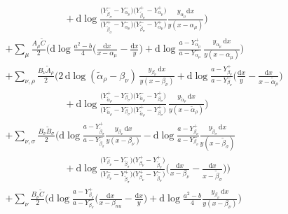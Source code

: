 \documentclass[a4paper,12pt]{article}
\newcommand{\dif}{\mathrm{d}} %
\begin{document}
\begin{enumerate}[label=(\roman*)]
\begin{align}
         &\qquad  \qquad  \qquad  +\dif \log\frac{\bigl(Y^{-}_{\tilde{\beta}_{\sigma}}-Y^{-}_{\alpha_{\mu}}\bigr)\bigl(Y^{+}_{\tilde{\beta}_{\sigma}}-Y^{+}_{\alpha_{\mu}}\bigr)}{\bigl(Y^{+}_{\tilde{\beta}_{\sigma}}-Y^{-}_{\alpha_{\mu}}\bigr)\bigl(Y^{-}_{\tilde{\beta}_{\sigma}}-Y^{+}_{\alpha_{\mu}}\bigr)} \frac{y_{\alpha_{\mu}}\dif x}{y(x-\alpha_{\mu})}\Biggr) \nonumber \\
         &+\sum_{\mu} \frac{A_{\mu}\tilde{C}}{2} \Biggl( \dif \log\frac{a^{2}-b}{4} \biggl(\frac{\dif x}{x-\alpha_{\mu}}-\frac{\dif x}{y}\biggr) 
          +\dif \log\frac{a-Y^{+}_{\alpha_{\mu}}}{a-Y^{-}_{\alpha_{\mu}}}\, \frac{y_{\alpha_{\mu}}\,\dif x}{y(x-\alpha_{\mu})} \Biggr) \nonumber \\
         &+\sum_{\nu,\rho} \frac{B_{\nu}\tilde{A}_{\rho}}{2}\Biggl( 2\,\dif \log(\tilde{\alpha}_{\rho}-\beta_{\nu})\,\frac{y_{\beta_{\nu}}\,\dif x}{y(x-\beta_{\nu})} 
          +\dif \log\frac{a-Y^{+}_{\beta_{\nu}}}{a-Y^{-}_{\beta_{\nu}}} \biggl(\frac{\dif x}{y}-\frac{\dif x}{x-\tilde{\alpha}_{\rho}}\biggr)  \nonumber \\
         & \qquad  \qquad  \qquad  + \dif \log\frac{\bigl(Y_{\tilde{\alpha}_{\rho}}^{+}-Y_{\beta_{\sigma}}^{-}\bigr)\bigl(Y_{\tilde{\alpha}_{\rho}}^{-}-Y_{\beta_{\sigma}}^{+}\bigr)}{\bigl(Y_{\tilde{\alpha}_{\rho}}^{-}-Y_{\beta_{\sigma}}^{-}\bigr)\bigl(Y_{\tilde{\alpha}_{\rho}}^{+}-Y_{\beta_{\sigma}}^{+}\bigr)} \,\frac{y_{\tilde{\alpha}_{\rho}}\,\dif x}{y(x-\tilde{\alpha}_{\rho})}\Biggr)  \nonumber   \\ 
         &+\sum_{\nu,\sigma} \frac{B_{\nu}\tilde{B}_{\sigma}}{2}\Biggl( \dif \log\frac{a-Y_{\tilde{\beta}_{\sigma}}^{+}}{a-Y_{\tilde{\beta}_{\sigma}}^{-}}\frac{y_{\beta_{\nu}}\,\dif x}{y(x-\beta_{\nu})} -\dif \log \frac{a-Y_{\beta_{\nu}}^{+}}{a-Y_{\beta_{\nu}}^{-}}  \frac{y_{\tilde{\beta}_{\sigma}}\,\dif x}{y(x-\tilde{\beta}_{\sigma})} \nonumber  \\ 
         &\qquad  \qquad  \qquad  +\dif \log \frac{\bigl(Y_{\beta_{\nu}}^{-}-Y_{\tilde{\beta}_{\sigma}}^{-}\bigr)\bigl(Y_{\beta_{\nu}}^{+}-Y_{\tilde{\beta}_{\sigma}}^{+}\bigr)}{\bigl(Y_{\beta_{\nu}}^{-}-Y_{\tilde{\beta}_{\sigma}}^{+}\bigr)\bigl(Y_{\beta_{\nu}}^{+}-Y_{\tilde{\beta}_{\sigma}}^{-}\bigr)} \biggl(\frac{\dif x}{x-\beta_{\nu}}- \frac{\dif x}{x-\tilde{\beta}_{\sigma}}\biggr)\Biggr)  \nonumber  \\
         &+\sum_{\nu} \frac{B_{\nu}\tilde{C}}{2} \Biggl( \dif \log\frac{a-Y_{\beta_{\nu}}^{+}}{a-Y_{\beta_{\nu}}^{-}} \biggl(\frac{\dif x}{x-\beta_{nu}}-\frac{\dif x}{y}\biggr) + \dif \log\frac{a^{2}-b}{4} \frac{y_{\beta_{\nu}}\,\dif x}{y(x-\beta_{\nu})} \Biggr) \nonumber \\

\end{align}
\end{enumerate}
\end{document}
